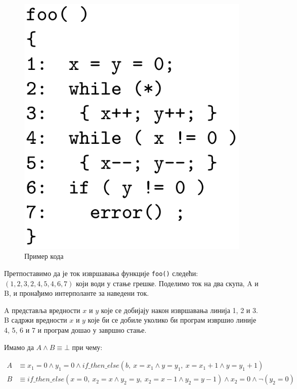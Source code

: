 \documentclass[a4paper]{article}
\begin{document}
{\begin{figure}[h!]
\begin{center}
    \includegraphics[scale=0.17]{./slike/interpolant_code.png}
\end{center}
\caption{Пример кода}
\label{fig:interpolant_example}
\end{figure}

Претпоставимо да је ток извршавања функције \texttt{foo()} следећи: $(1, 2, 3, 2, 4, 5, 4, 6, 7)$ који
води у стање грешке. Поделимо ток на два скупа, A и B, и пронађимо интерполанте за наведени ток.

A представља вредности $x$ и $y$ које се добијају након извршавања линија 1, 2 и 3. B садржи вредности $x$ и $y$
које би се добиле уколико би програм извршио линије 4, 5, 6 и 7 и програм дошао у завршно стање.

Имамо да $A \land B \equiv \bot$ при чему:

\begin{equation*}
\begin{split}
    A & \equiv x_1 = 0 \land y_1 = 0 \land if\_then\_else(b,\  x = x_1 \land y = y_1,\ x = x_1 + 1 \land y = y_1 + 1)     \\
    B & \equiv if\_then\_else(x = 0,\ x_2 = x \land y_2 = y,\ x_2 = x - 1 \land y_2 = y-1) \land x_2 = 0 \land \neg (y_2 = 0)
\end{split}
\end{equation*}

}
\end{document}

